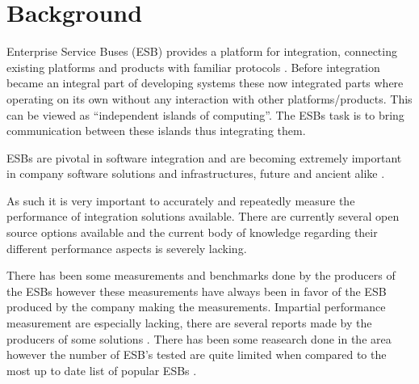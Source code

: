 \documentclass{llncs}
\begin{document}
\section{Background}
\label{sec:background}


Enterprise Service Buses (ESB) provides a platform for integration, connecting existing platforms and products with familiar protocols \cite{falko07} . Before integration became an integral part of developing systems these now integrated parts where operating on its own without any interaction with other platforms/products. This can be viewed as ``independent islands of computing''. The ESBs task is to bring communication between these islands thus integrating them.

ESBs are pivotal in software integration and are becoming extremely important in company software solutions and infrastructures, future and ancient alike \cite{fenner03}.

As such it is very important to accurately and repeatedly measure the performance of integration solutions available. 
There are currently several open source options available \cite{mehta11} and the current body of knowledge regarding their different performance aspects is severely lacking. 


There has been some measurements and benchmarks done by the producers of the ESBs however these measurements have always been in favor of the ESB produced by the company making the measurements. 
Impartial performance measurement are especially lacking, there are several reports made by the producers of some solutions \cite{Perera07,mulevsjboss,mulevsglassfish,mulevsservicemix,mulesoft08}.
There has been some reasearch done in the area \cite{ESBthesis} however the number of ESB's tested are quite limited when compared to the most up to date list of popular ESBs \cite{mehta11}.
\end{document}
